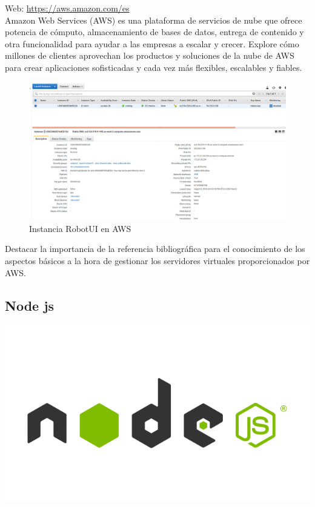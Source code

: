 Web: \url{https://aws.amazon.com/es}\\

Amazon Web Services (AWS) es una plataforma de servicios de nube que ofrece potencia de cómputo, almacenamiento de bases de datos, entrega de contenido y otra funcionalidad para ayudar a las empresas a escalar y crecer. Explore cómo millones de clientes aprovechan los productos y soluciones de la nube de AWS para crear aplicaciones sofisticadas y cada vez más flexibles, escalables y fiables.\\

\begin{figure}
\includegraphics[scale=0.3]{imagenes/aws_instance.png}
\caption{Instancia RobotUI en AWS}
\end{figure}

Destacar la importancia de la referencia bibliográfica \cite{book:awsdummies} para el conocimiento de los aspectos básicos a la hora de gestionar los servidores virtuales proporcionados por AWS.


\subsection{Node js}

\begin{center}
\includegraphics[scale=0.3]{imagenes/nodejs-logo.png}
\end{center}

